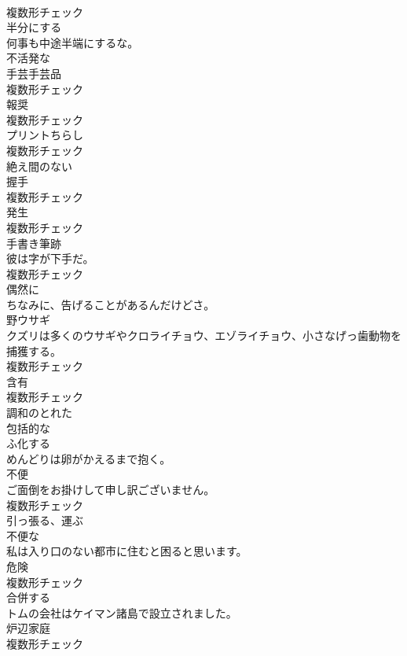 \documentclass[8pt]{extreport}
\begin{document}
\begin{CJK}{UTF8}{min}
\\	複数形チェック
\\	[動詞]	半分にする	
\\	何事も中途半端にするな。	
\\	[形容詞]	不活発な	
\\	[名詞]	手芸手芸品	
\\	複数形チェック
\\	[名詞]	報奨	
\\	複数形チェック
\\	[名詞]	プリントちらし	
\\	複数形チェック
\\	[形容詞]	絶え間のない	
\\	[名詞]	握手	
\\	複数形チェック
\\	[名詞]	発生	
\\	複数形チェック
\\	[名詞]	手書き筆跡	
\\	彼は字が下手だ。	
\\	複数形チェック
\\	[副詞]	偶然に	
\\	ちなみに、告げることがあるんだけどさ。	
\\	[名詞]	野ウサギ	
\\	クズリは多くのウサギやクロライチョウ、エゾライチョウ、小さなげっ歯動物を捕獲する。	
\\	複数形チェック
\\	[名詞]	含有	
\\	複数形チェック
\\	[形容詞]	調和のとれた	
\\	[形容詞]	包括的な	
\\	[動詞]	ふ化する	
\\	めんどりは卵がかえるまで抱く。	
\\	[名詞]	不便	
\\	ご面倒をお掛けして申し訳ございません。	
\\	複数形チェック
\\	[動詞]	引っ張る、運ぶ	
\\	[形容詞]	不便な	
\\	私は入り口のない都市に住むと困ると思います。	
\\	[名詞]	危険	
\\	複数形チェック
\\	[動詞]	合併する	
\\	トムの会社はケイマン諸島で設立されました。	
\\	[名詞]	炉辺家庭	
\\	複数形チェック

\end{CJK}
\end{document}
